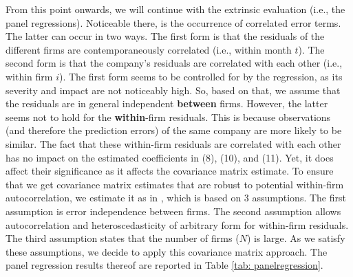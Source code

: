 \documentclass[11pt]{article}
\begin{document}
From this point onwards, we will continue with the extrinsic evaluation (i.e., the panel regressions). 
Noticeable there, is the occurrence of correlated error terms. The latter can occur in two ways. The first form is that the residuals of the different firms are contemporaneously correlated (i.e., within month $t$). The second form is that the company's residuals are correlated with each other (i.e., within firm $i$). The first form seems to be controlled for by the regression, as its
severity and impact are not noticeably high. So, based on that, we assume that the residuals are in general independent \textbf{between} firms. However, the latter seems not to hold for the \textbf{within}-firm residuals. This is because observations (and therefore the prediction errors) of the same company are more likely to be similar. The fact that these within-firm residuals are correlated with each other has no impact on the estimated coefficients in (8), (10), and (11). Yet, it does affect their significance as it affects the covariance matrix estimate. To ensure that we get covariance matrix estimates that are robust to potential within-firm autocorrelation, we estimate it as in \cite{arellano1987computing}, which is based on 3 assumptions. The first assumption is error independence between firms. The second assumption allows autocorrelation and heteroscedasticity of arbitrary form for within-firm residuals. The third assumption states that the number of firms ($N$) is large. As we satisfy these assumptions, we decide to apply this covariance matrix approach. The panel regression results thereof are reported in Table \ref{tab: panelregression}.\\
\end{document}
